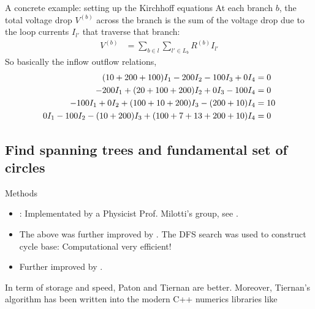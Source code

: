 \documentclass[xcolor=dvipsnames]{beamer}
\begin{document}
\begin{frame}{A concrete example: setting up the Kirchhoff equations}
At each branch $b$, the total voltage drop $V^{(b)}$ across the branch is the sum of the voltage drop due to the loop currents $I_{l'}$ that traverse that branch:
\begin{align*}
	V^{(b)} &= \sum_{b\in l}\sum_{l'\in L_b} R^{(b)}I_{l'}
\end{align*}
So basically the inflow outflow relations,
\begin{align}\label{eq1}
	(10 + 200 + 100)I_1 - 200 I_2 - 100 I_3 + 0 I_4 &= 0\\
	-200 I_1 + (20 + 100 + 200) I_2 + 0 I_3 - 100 I_4 &= 0\notag\\
	-100 I_1 + 0 I_2 + (100 + 10 + 200)I_3 - (200+10)I_4 &=10\notag\\
	0 I_1 - 100 I_2 - (10+200) I_3 + (100 + 7 + 13 + 200 + 10) I_4 &= 0\notag
\end{align}
\end{frame}

\subsection{Find spanning trees and fundamental set of circles}

\begin{frame}{Methods}
	\begin{itemize}
		\item  \href{https://dl.acm.org/doi/pdf/10.1145/363848.363861}{}: Implementated by a Physicist Prof. Milotti's group, see \href{https://github.com/edymil/CircuitMath}{}.
		\item The above was further improved by \href{http://www.cs.kent.edu/~dragan/GraphAn/CycleBasis/p514-paton.pdf}{}. The DFS search was used to construct cycle base: Computational very efficient!
		\item Further improved by \href{https://dl.acm.org/doi/pdf/10.1145/362814.362819}{}. %
	\end{itemize}
	In term of storage and speed, Paton and Tiernan are better. Moreover, Tiernan's algorithm has been written into the modern C++ numerics libraries like \href{https://www.boost.org/}{}
\end{frame}
\end{document}
